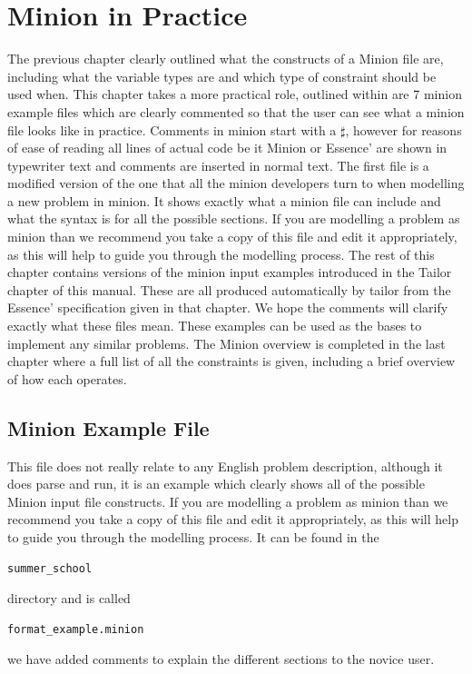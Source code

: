 \documentclass[oneside]{book}
\begin{document}
\chapter{Minion in Practice}
The previous chapter clearly outlined what the constructs of a Minion file are, including what the variable types are and which type of constraint should be used when. This chapter takes a more practical role, outlined within are 7 minion example files which are clearly commented so that the user can see what a minion file looks like in practice. Comments in minion start with a $\sharp$, however for reasons of ease of reading all lines of actual code be it Minion or Essence' are shown in typewriter text and comments are inserted in normal text. The first file is a modified version of the one that all the minion developers turn to when modelling a new problem in minion. It shows exactly what a minion file can include and what the syntax is for all the possible sections. If you are modelling a problem as minion than we recommend you take a copy of this file and edit it appropriately, as this will help to guide you through the modelling process. The rest of this chapter contains versions  of the minion input examples introduced in the Tailor chapter of this manual. These are all produced automatically by tailor from the Essence' specification given in that chapter. We hope the comments will clarify exactly what these files mean. These examples can be used as the bases to implement any similar problems. The Minion overview is completed in the last chapter where a full list of all the constraints is given, including a brief overview of how each operates. 

\section{Minion Example File}
This file does not really relate to any English problem description, although it does parse and run,  it is an example which clearly shows all of the possible Minion input file constructs. If you are modelling a problem as minion than we recommend you take a copy of this file and edit it appropriately, as this will help to guide you through the modelling process. It can be found in the \begin{verbatim}summer_school\end{verbatim} directory and is called \begin{verbatim}format_example.minion\end{verbatim} we have added comments  to explain the different sections to the novice user. 
\end{document}
